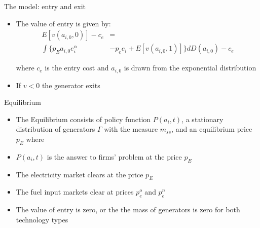 \documentclass{beamer}
\begin{document}
\begin{frame}{The model: entry and exit}
\begin{itemize}
    \item The value of entry is given by: 
    \begin{equation*}
    \begin{aligned} 
    E[v(a_{i,0},0)]-c_{e}&=\\\int \big\{ p_Ea_{i,0} e_i^\alpha &-p_e e_i+E[v(a_{i,0},1)] \big\} dD(a_{i,0})-c_{e}
\end{aligned}
    \end{equation*}
    
where $c_{e}$ is the entry cost and $a_{i,0}$ is drawn from the exponential distribution
\hfill \break
    \item If $v<0$ the generator exits
\end{itemize}
    
\end{frame}
\begin{frame}{Equilibrium}
    \begin{itemize}
        \item The Equilibrium consists of policy function $P(a_i,t)$, a stationary distribution of generators $\Gamma$ with the measure $m_{ss}$, and an equilibrium price $p_E$ where
        \item  $P(a_i,t)$ is the answer to firms' problem at the price $p_E$
        \item The electricity market clears at the price $p_E$ 
        \item The fuel input markets clear at prices $p_e^o$ and $p_e^n$
        \item The value of entry is zero, or the the mass of generators is zero for both technology types
    \end{itemize}
\end{frame}

\end{document}
